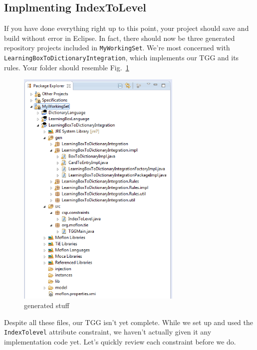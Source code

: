 \newpage
\hypertarget{rules common}{}
\subsection{Implmenting IndexToLevel}
\genHeader

If you have done everything right up to this point, your project should save and build without error in Eclipse. In fact, there should now be three
generated repository projects included in \texttt{MyWorkingSet}. We're most concerned with \texttt{LearningBox\-To\-Dictionary\-Integration}, which implements
our TGG and its rules. Your folder should resemble Fig.~\ref{fig:tggGenerated}


\begin{figure}[htbp]
\begin{center}
  \includegraphics[width=0.7\textwidth]{eclipse_generatedTGG}
  \caption{generated stuff}
  \label{fig:tggGenerated}
\end{center}
\end{figure}

Despite all these files, our TGG isn't yet complete. While we set up and used the \texttt{IndexTolevel} attribute constraint, we haven't actually given it any
implementation code yet. Let's quickly review each constraint before we do.

